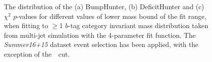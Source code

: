 \begin{figure}[!htb]
  \begin{center}
    \captionsetup[subfigure]{aboveskip=0pt,justification=centering}
  \end{center}
  \caption{The distribution of the (a) BumpHunter, (b) DeficitHunter and (c) $\chi^{2}$ $p$-values
    for different values of lower mass bound of the fit range, when fitting to $\geq$1 $b$-tag category
    invariant mass distribution taken from multi-jet simulation with the 4-parameter fit function.
    The \textit{Summer16+15} dataset event selection has been applied, with the exception of the~\mjj~cut.}
  \label{fig:mjjGraphs_bj_inc}
\end{figure}

